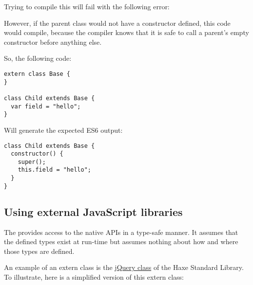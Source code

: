 Trying to compile this will fail with the following error: 

However, if the parent  class would not have a constructor defined, this code would compile, because the compiler knows that it is safe to call a parent's empty  constructor before anything else.

So, the following code:

\begin{lstlisting}
extern class Base {
}

class Child extends Base {
  var field = "hello";
}
\end{lstlisting}

Will generate the expected ES6 output:

\begin{lstlisting}
class Child extends Base {
  constructor() {
    super();
    this.field = "hello";
  }
}
\end{lstlisting}

\subsection{Using external JavaScript libraries}
\label{target-javascript-external-libraries}

The  provides access to the native APIs in a type-safe manner. It assumes that the defined types exist at run-time but assumes nothing about how and where those types are defined. 

An example of an extern class is the \href{https://github.com/HaxeFoundation/haxe/blob/development/std/js/jquery/JQuery.hx}{jQuery class} of the Haxe Standard Library. 
To illustrate, here is a simplified version of this extern class:

